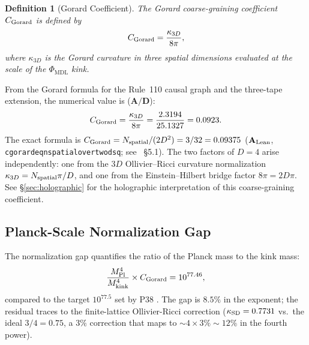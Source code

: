 \documentclass[11pt]{article}
\newtheorem{definition}[theorem]{Definition}
\theoremstyle{remark}
\newcommand{\PHIMDL}{\Phi_{\mathrm{MDL}}}
\newcommand{\lean}[1]{%
  \penalty-100
  \begingroup\def\_{\textunderscore\allowbreak}\texttt{#1}\endgroup}
\newcommand{\Mkink}{M_{\rm kink}}
\newcommand{\CatAL}{\ensuremath{\textbf{A}_{\rm Lean}}}
\newcommand{\CatAD}{\textbf{A/D}}
\begin{document}
\begin{definition}[Gorard Coefficient]
The Gorard coarse-graining coefficient $C_{\rm Gorard}$ is defined by
\begin{equation}
  C_{\rm Gorard} = \frac{\kappa_{3D}}{8\pi},
  \label{eq:cgorard}
\end{equation}
where $\kappa_{3D}$ is the Gorard curvature in three spatial dimensions
evaluated at the scale of the $\PHIMDL$ kink.
\end{definition}

From the Gorard formula for the Rule~110 causal graph and the three-tape
extension, the numerical value is ($\CatAD$):
\begin{equation}
  C_{\rm Gorard} = \frac{\kappa_{3D}}{8\pi}
  = \frac{2.3194}{25.1327} = 0.0923.
  \label{eq:cgorard-value}
\end{equation}
The exact formula is $C_{\rm Gorard} = N_{\rm spatial}/(2D^2) = 3/32 = 0.09375$
(\CatAL, \lean{c\_gorard\_eq\_n\_spatial\_over\_two\_dsq};
see~\cite{SpivackGTECosmology} \S5.1).
The two factors of $D=4$ arise independently: one from the $3D$
Ollivier--Ricci curvature normalization $\kappa_{3D} = N_{\rm spatial}\pi/D$,
and one from the Einstein--Hilbert bridge factor $8\pi = 2D\pi$.
See \S\ref{sec:holographic} for the holographic interpretation of this coarse-graining coefficient.

\subsection{Planck-Scale Normalization Gap}
\label{ssec:planck-gap}

The normalization gap quantifies the ratio of the Planck mass to the kink mass:
\begin{equation}
  \frac{M_{\rm Pl}^4}{\Mkink^4} \times C_{\rm Gorard}
  = 10^{77.46},
  \label{eq:norm-gap}
\end{equation}
compared to the target $10^{77.5}$ set by P38 \cite{SpivackPhiMDLGravity}.
The gap is $8.5\%$ in the exponent; the residual traces to the finite-lattice
Ollivier-Ricci correction ($\kappa_{\rm SD} = 0.7731$ vs.\ the ideal
$3/4 = 0.75$, a $3\%$ correction that maps to $\sim 4 \times 3\% \sim 12\%$
in the fourth power).
\end{document}

